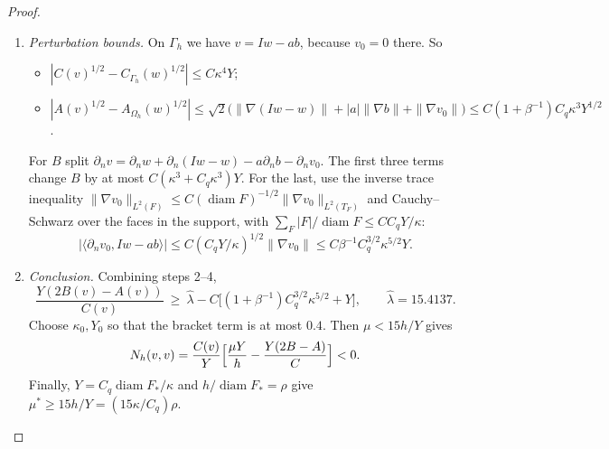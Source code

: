\documentclass[11pt]{article}
\theoremstyle{remark}\newtheorem{remark}[theorem]{Remark}
\newcommand{\Oh}{\Omega_h}\newcommand{\Gh}{\Gamma_h}\newcommand{\hG}{h_\Gamma}\newcommand{\dn}{\partial_n}
\newcommand{\norm}[1]{\|#1\|}\newcommand{\ip}[2]{\langle #1,#2\rangle}\DeclareMathOperator{\curl}{curl}\DeclareMathOperator{\diam}{diam}
\begin{document}
\begin{proof}
\begin{enumerate}[label=\arabic*.]
 \[\norm{w-Iw}_{L^\infty}\le C\kappa^4,\qquad \norm{\nabla(w-Iw)}_{L^\infty}\le C\kappa^3/Y.\]
 Let $b:=\sum_{F\subset\Gh\cap B(x_0,Y)}b_Fn_F$, with cubic face bubbles.
 \begin{itemize}
 \item $\int_{\Gh}b\cdot n\ge cY^2$, since $\Gh\cap B(x_0,Y)$ has area $\ge cY^2$ and the faces have size $\le\kappa Y$.
 \item $|\nabla b|\le C/\diam F\le CC_q/(\kappa Y)$ pointwise.
 \item The number of faces is at most $CC_q^2/\kappa^2$, and $\norm{\nabla b}^2\le C\sum_F\diam F\le CC_q^2Y/\kappa$.
 \end{itemize}
 Put $m:=\int_{\Gh}Iw\cdot n$. Since $\int_{\Gh}w\cdot n=\int_{\Gh}\curl\Psi\cdot n=0$ on the closed surface $\Gh$, $|m|\le CY^2\kappa^4$. Put $a:=m/\int_{\Gh}b\cdot n$, so $|a|\le C\kappa^4$. Then $Iw-ab\in V_h^R$ and $\int_{\Oh}\operatorname{div}(Iw-ab)=0$, so (IS3) gives $v_0\in V_h^0$ with $\operatorname{div}v_0=\operatorname{div}(Iw-ab)$ and
 \[\norm{\nabla v_0}\le\beta^{-1}\bigl(\sqrt3\,\norm{\nabla(Iw-w)}+|a|\norm{\nabla b}\bigr)\le C\beta^{-1}(\kappa^3+C_q\kappa^{7/2})Y^{1/2}.\]
 Set $v:=Iw-ab-v_0\in Z_h$.
\item \emph{Perturbation bounds.} On $\Gh$ we have $v=Iw-ab$, because $v_0=0$ there. So
 \begin{itemize}
 \item $|C(v)^{1/2}-C_{\Gh}(w)^{1/2}|\le C\kappa^4Y$;
 \item $|A(v)^{1/2}-A_{\Oh}(w)^{1/2}|\le\sqrt2\bigl(\norm{\nabla(Iw-w)}+|a|\norm{\nabla b}+\norm{\nabla v_0}\bigr)\le C(1+\beta^{-1})C_q\kappa^3Y^{1/2}$.
 \end{itemize}
 For $B$ split $\dn v=\dn w+\dn(Iw-w)-a\dn b-\dn v_0$. The first three terms change $B$ by at most $C(\kappa^3+C_q\kappa^3)Y$. For the last, use the inverse trace inequality $\norm{\nabla v_0}_{L^2(F)}\le C(\diam F)^{-1/2}\norm{\nabla v_0}_{L^2(T_F)}$ and Cauchy--Schwarz over the faces in the support, with $\sum_F|F|/\diam F\le CC_qY/\kappa$:
 \[|\ip{\dn v_0}{Iw-ab}|\le C(C_qY/\kappa)^{1/2}\norm{\nabla v_0}\le C\beta^{-1}C_q^{3/2}\kappa^{5/2}Y.\]
\item \emph{Conclusion.} Combining steps 2--4,
 \[\frac{Y(2B(v)-A(v))}{C(v)}\ \ge\ \hat\lambda-C\bigl[(1+\beta^{-1})C_q^{3/2}\kappa^{5/2}+Y\bigr],\qquad \hat\lambda=15.4137.\]
 Choose $\kappa_0,Y_0$ so that the bracket term is at most $0.4$. Then $\mu<15h/Y$ gives
 \[N_h(v,v)=\frac{C(v)}{Y}\Bigl[\frac{\mu Y}{h}-\frac{Y(2B-A)}{C}\Bigr]<0.\]
 Finally, $Y=C_q\diam F_\ast/\kappa$ and $h/\diam F_\ast=\rho$ give $\mu^\ast\ge15h/Y=(15\kappa/C_q)\rho$.\qedhere
\end{enumerate}
\end{proof}
\end{document}
